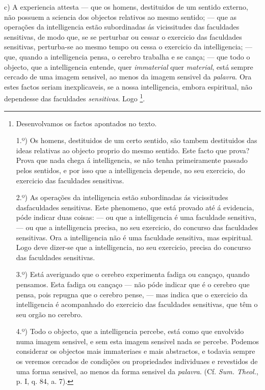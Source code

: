 c) A experiencia attesta --- que os homens, destituidos de um sentido externo, não possuem a sciencia dos objectos relativos ao mesmo sentido; --- que as operações da intelligencia estão subordinadas ás vicissitudes das faculdades sensitivas, de modo que, se se perturbar ou cessar o exercicio das faculdades sensitivas, perturba-se ao mesmo tempo ou cessa o exercicio da intelligencia; --- que, quando a intelligencia pensa, o cerebro trabalha e se cança; --- que todo o objecto, que a intelligencia entende, quer \emph{immaterial} quer \emph{material}, está sempre cercado de uma imagem sensivel, ao menos da imagem sensivel da \emph{palavra}. Ora estes factos seriam inexplicaveis, se a nossa intelligencia, embora espiritual, não dependesse das faculdades \emph{sensitivas}. Logo \footnote{Desenvolvamos os factos apontados no texto.\par 1.º) Os homens, destituidos de um certo sentido, são tambem destituidos das ideas relativas ao objecto proprio do mesmo sentido. Este facto que prova? Prova que nada chega á intelligencia, se não tenha primeiramente passado pelos sentidos, e por isso que a intelligencia depende, no seu exercicio, do exercicio das faculdades sensitivas.\par 2.º) As operações da intelligencia estão subordinadas ás vicissitudes dasfaculdades sensitivas. Este phenomeno, que está provado até á evidencia, póde indicar duas coisas: --- ou que a intelligencia é uma faculdade sensitiva, --- ou que a intelligencia precisa, no seu exercicio, do concurso das faculdades sensitivas. Ora a intelligencia não é uma faculdade sensitiva, mas espiritual. Logo deve dizer-se que a intelligencia, no seu exercicio, precisa do concurso das faculdades sensitivas.\par 3.º) Está averiguado que o cerebro experimenta fadiga ou cançaço, quando pensamos. Esta fadiga ou cançaço --- não póde indicar que é o cerebro que pensa, pois repugna que o cerebro pense, --- mas indica que o exercicio da intelligencia é acompanhado do exercicio das faculdades sensitivas, que têm o seu orgão no cerebro.\par 4.º) Todo o objecto, que a intelligencia percebe, está como que envolvido numa imagem sensivel, e sem esta imagem sensivel nada se percebe. Podemos considerar os objectos mais immateriaes e mais abstractos, e todavia sempre os veremos cercados de condições ou propriedades individuaes e revestidos de uma forma sensivel, ao menos da forma sensivel da \emph{palavra}. (Cf. \emph{Sum. Theol.}, p. I, q. 84, a. 7).}.

